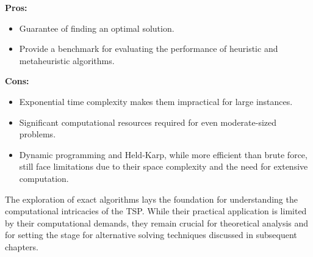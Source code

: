 \textbf{Pros:}
\begin{itemize}
	\item Guarantee of finding an optimal solution.
	\item Provide a benchmark for evaluating the performance of heuristic and metaheuristic algorithms.
\end{itemize}

\textbf{Cons:}
\begin{itemize}
	\item Exponential time complexity makes them impractical for large instances.
	\item Significant computational resources required for even moderate-sized problems.
	\item Dynamic programming and Held-Karp, while more efficient than brute force, still face limitations due to their space complexity and the need for extensive computation.
\end{itemize}

The exploration of exact algorithms lays the foundation for understanding the computational intricacies of the TSP. While their practical application is limited by their computational demands, they remain crucial for theoretical analysis and for setting the stage for alternative solving techniques discussed in subsequent chapters.
